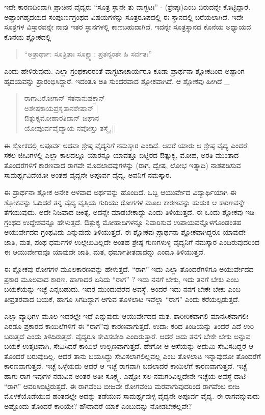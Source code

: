 ಇದೇ ಕಾರಣದಿಂದಾಗಿ ಪ್ರಾಚೀನ ವೈದ್ಯರು “ಸೂತ್ರ ಸ್ಥಾನೇ ತು ವಾಗ್ಭಟಃ” - (ಶ್ರೇಷ್ಠಃ)ಎಂಬ ಬಿರುದನ್ನೇ ಕೊಟ್ಟಿದ್ದಾರೆ. ಅಷ್ಟಾಂಗಹೃದಯದ ಸಂಪೂರ್ಣಗ್ರಂಥದ ವಿಷಯಗಳನ್ನು ಸೂತ್ರರೂಪದಲ್ಲಿ ಈ ಸ್ಥಾನದಲ್ಲಿ ಬರೆಯಲಾಗಿದೆ. ಇದೇ ಸೂತ್ರಗಳ ವಿಸ್ತಾರವನ್ನೇ ನಾವು ಇತರ ಸ್ಥಾನಗಳಲ್ಲಿ ಕಾಣಬಹುದಾಗಿದೆ. ಇದನ್ನೇ ಸೂತ್ರಸ್ಥಾನದ ಕೊನೆಯ ಅಧ್ಯಾಯದ ಕೊನೆಯ ಶ್ಲೋಕದಲ್ಲಿ 
\begin{verse}
“ಅತ್ರಾರ್ಥಾ: ಸೂತ್ರಿತಾಃ ಸೂಕ್ಷ್ಮಾ: ಪ್ರತನ್ಯಂತೇ ಹಿ ಸರ್ವತಃ” 
\end{verse}
ಎಂದು ಹೇಳಿರುವುದು. ಎಲ್ಲಾ ಗ್ರಂಥಕಾರರಂತೆ ವಾಗ್ಭಟಾಚಾರ್ಯರೂ ಕೂಡಾ ಪ್ರಾರ್ಥನಾ ಶ್ಲೋಕದಿಂದ ಅಷ್ಟಾಂಗ ಹೃದಯವನ್ನು ಪ್ರಾರಂಭಿಸಿದ್ದಾರೆ. ಇದಂತೂ ಅತಿ ಸುಂದರವಾದ ಶ್ಲೋಕವಾಗಿದೆ. ಆ ಶ್ಲೋಕವು ಹೀಗಿದೆ \_
\begin{verse}
ರಾಗಾದಿರೋಗಾನ್ ಸತನಾನುಷಕ್ತಾನ್\\
ಅಶೇಷಕಾಯಪ್ರಸೃತಾನಶೇಷಾನ್ |\\
ಔತ್ಸುಕ್ಯಮೋಹಾರತಿದಾನ್‍ ಜಘಾನ\\
ಯೋಪೂರ್ವವೈದ್ಯಾಯ ನವೋಸ್ತು ತಸ್ಮೈ ||
\end{verse}
ಈ ಶ್ಲೋಕದಲ್ಲಿ ಅಪೂರ್ವ ಅಥವಾ ಶ್ರೇಷ್ಠ ವೈದ್ಯನಿಗೆ ನಮಸ್ಕಾರ ಎಂದಿದೆ. ಆದರೆ ಯಾರು ಆ ಶ್ರೇಷ್ಠ ವೈದ್ಯ ಎಂದರೆ ಸಕಲ ಜೀವಿಗಳಲ್ಲಿ ಎಲ್ಲಾ ಕಾಲದಲ್ಲೂ ಯಾರನ್ನೂ ಯಾವತ್ತೂ ಬಿಟ್ಟಿರದ ಔತ್ಸುಕ್ಯ, ಮೋಹ, ಅರತಿ ಮುಂತಾದ ತೊಂದರೆಗಳಿಗೆ ಕಾರಣವಾದ ರಾಗವೇ ಮೊದಲಾದವುಗಳನ್ನು (ರಾಗ, ದ್ವೇಷ, ಲೋಭ ಇತ್ಯಾದಿ) ನಾಶಪಡಿಸುವ ಸಾಮರ್ಥ್ಯವಿದೆಯೋ ಅಂತಹ ವೈದ್ಯನೇ ಅಪೂರ್ವ ವೈದ್ಯ. ಅವನಿಗೆ ನಮಸ್ಕಾರ.

ಈ ಪ್ರಾರ್ಥನಾ ಶ್ಲೋಕ ಅನೇಕ ಆಳವಾದ ಅರ್ಥವನ್ನು ಹೊಂದಿದೆ. ಒಬ್ಬ ಆಯುರ್ವೇದ ವಿದ್ಯಾರ್ಥಿಯಾಗಿ  ಈ ಶ್ಲೋಕವನ್ನು ಓದಿದರೆ ತನ್ನ ವೈದ್ಯ ವೃತ್ತಿಯ ಗುರಿಯು ರೋಗಗಳ ಮೂಲ ಕಾರಣವನ್ನು ಹುಡುಕಿ ಆ ಕಾರಣವನ್ನೇ ತೆಗೆಯುವುದು. ಅದೇ ನಿಜವಾದ ಚಿಕಿತ್ಸೆ, ಅದನ್ನೇ ಮಾಡಬೇಕಾದ್ದು ಎಂದು ತಿಳಿಯುತ್ತದೆ. ಈ ಒಂದು ಶ್ಲೋಕವು ಇಡಿ ಗ್ರಂಥದ ಉದ್ದೇಶವನ್ನೂ ಹೇಳುತ್ತದೆ. ಔತ್ಸುಕ್ಯ ಮೋಹಾದಿಗಳನ್ನೂ ನಿವಾರಿಸುವ ಉಪಾಯವನ್ನೊಳಗೊಂಡಂತಹ ಆಯುರ್ವೇದದ ಗ್ರಂಥವಿದು ಎನ್ನುವುದು ತಿಳಿಯುತ್ತದೆ. ಈ ಶ್ಲೋಕವು ಪ್ರಾರ್ಥನಾ ಶ್ಲೋಕವಾಗಿದ್ದರೂ ಯಾವುದೇ ಜಾತಿ, ಮತ, ಪಂಥ ಧರ್ಮಗಳ ಉಲ್ಲೇಖವಿಲ್ಲದೇ ಅಂತಹ ಶ್ರೇಷ್ಠ ಗುಣಗಳುಳ್ಳ ವೈದ್ಯನಿಗೆ ನಮಸ್ಕಾರ ಎಂದಿರುವುದರಿಂದ ಈ ಆಯುರ್ವೇದವೂ ಯಾವುದೇ ಜಾತಿ, ಮತ, ಧರ್ಮಾತೀತವಾದದ್ದು ಎಂದೂ ತಿಳಿಯುತ್ತದೆ.

ಈ ಶ್ಲೋಕವು ರೋಗಗಳ ಮೂಲಕಾರಣವನ್ನು ಹೇಳುತ್ತದೆ. “ರಾಗ” ಇದು ಎಲ್ಲಾ ತೊಂದರೆಗಳಿಗೂ ಅಯುರ್ವೇದದ ಪ್ರಕಾರ ಮೂಲವಾದ ಕಾರಣ. ಹಾಗಾದರೆ ಏನಿದು “ರಾಗ” ? ಇದು ನನಗೆ ಬೇಕು, ಇದು ತನಗೆ ಬೇಕು ಎಂಬ ಬಯಕೆಯನ್ನು ಇಚ್ಛೆ ಎನ್ನಬಹುದು. ಇದರ ಮುಂದುವರೆದ ಅವಸ್ಥೆ. ಅಂದರೆ ಇದು ನನಗೆ ಬೇಕೇ ಬೇಕು ಎಂಬ ತೀವ್ರತರವಾದ ಬಯಕೆ, ಹಾಗೂ ಸಿಗದಿದ್ದಾಗ ಆಗುವ ತೊಳಲಾಟ ಇವೆಲ್ಲಾ “ರಾಗ” ಎಂದು ಕರೆಯಲ್ಪಡುತ್ತದೆ.

ಎಲ್ಲಾ ವ್ಯಾಧಿಗಳ ಮೂಲ ಇದರಲ್ಲೇ ಇದೆ ಎನ್ನುವುದು ಆಯುರ್ವೇದದ ಮತ. ಶಾರೀರಿಕವಾಗಲಿ ಮಾನಸಿಕವಾಗಲೀ ಎರಡೂ ಪ್ರಕಾರದ ಕಾಯಿಲೆಗಳಿಗೆ ಈ “ರಾಗ”ವು ಕಾರಣವಾಗುತ್ತದೆ. ಉದಾ: ಕರಿದ ತಿಂಡಿಯನ್ನು ತಿಂದರೆ ಎದೆ ಉರಿ ಬರುತ್ತದೆ ಎಂದು ತಿಳಿದಿರುತ್ತದೆ. ವೈದ್ಯರೂ ಸೇವಿಸಬೇಡಿ ಎಂದಿರುತ್ತಾರೆ. ಆದರೆ ಅದು ತನಗೆ ಬೇಕೇ ಬೇಕು ಅನ್ನುವ ಬಯಕೆ ಉತ್ಕಟವಾಗಿ, ಸೇವಿಸಿದರೆ ಕಾಯಿಲೆ ಉಲ್ಬಣವಾಗುತ್ತದೆ. ಹೇಗೋ ಆ ಆಸೆಯನ್ನು ಅದುಮಿ ಸೇವಿಸದಿದ್ದರೆ ಆ ತೊಂದರೆ ಬರುವುದಿಲ್ಲ. ಆದರೆ ತಾನು ಬಯಸಿದ್ದು ಸೇವಿಸಲಾಗಲಿಲ್ಲವಲ್ಲ ಎಂಬ ತೊಳಲಾಟ ಇನ್ನಾವುದೋ ತೊಂದರೆಗೆ  ಕಾರಣವಾಗುತ್ತದೆ. ಇಚ್ಛೆ ಒಳ್ಳೆಯದು ಆದರೆ ಆ ಇಚ್ಛೆ ರಾಗವಾಗಿ ಬದಲಾದರೆ ಕಾಯಿಲೆಗೆ ಕಾರಣವಾಗುತ್ತದೆ. ಇಚ್ಛೆ ಹಾಗು ರಾಗ ಇವುಗಳ ನಡುವಿನ ಅಂತರ ಅತೀ ಸೂಕ್ಷ್ಮ. ಎಷ್ಟೋ ಸಲ ನಮಗರಿವಿಲ್ಲದೇನೇ ಇಚ್ಛೆಯ ಅವಸ್ಥೆ ದಾಟಿ “ರಾಗ” ಆವರಿಸಿಬಿಟ್ಟಿರುತ್ತದೆ. ಈ ರಾಗವೆಂಬ ಬೀಜವೇ ರೋಗವೆಂಬ ಮರವಾಗುವುದರಿಂದ ರಾಗವೆಂಬ ಬೀಜ ಮೊಳಕೆಯೊಡೆಯುವ ಹಂತದಲ್ಲೇ ಅದನ್ನು ತಡೆಯುವ ಸಾಮರ್ಥ್ಯವುಳ್ಳ ವೈದ್ಯನೇ ಅಪೂರ್ವ ವೈದ್ಯ. ಈ ರಾಗವನ್ನುವುದು ಅಷ್ಟೊಂದು ತೊಂದರೆ ಕಾರಿಯೇ? ಹೌದಾದರೆ ಯಾಕೆ ಎಂಬುದನ್ನು ನೋಡಬೇಕಲ್ಲವೇ?

